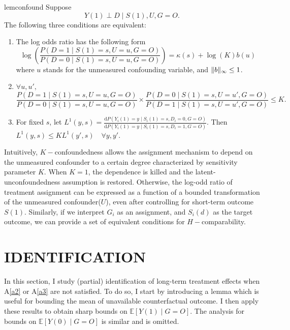 \documentclass[12pt]{article}
\newcommand{\Ep}{\mathbb{E}}
\DeclarePairedDelimiter{\norm}{\lVert}{\rVert}
\begin{document}
	\begin{restatable}{lem}{confound}
		\label{confound}
		Suppose $$Y(1) \perp D \mid S(1), U, G = O.$$
		The following three conditions are equivalent:
		\begin{enumerate}[label=(\alph*)]
			\item The log odds ratio has the following form $$\log \left(\frac{P(D=1 \mid S(1) = s, U=u, G = O)}{P(D=0 \mid S(1)=s, U=u, G = O)}\right)=\kappa(s)+\log (K) b(u)$$
			where $u$ stands for the unmeasured confounding variable, and $\norm{b}_{\infty} \leq 1$.

			\item $\forall u, u',$ $$\frac{P(D=1 \mid S(1) = s, U=u, G =O)}{P(D=0 \mid S(1)=s, U=u, G = O)} \times\frac{P(D=0 \mid S(1) = s, U=u', G =O)}{P(D=1 \mid S(1)=s, U=u', G = O)} \leq K.$$
			
			\item For fixed $s$, let $L^1(y,s) = \frac{\mathrm{d} P(Y_i(1) = y \mid S_i(1) = s, D_i = 0, G = O)}{\mathrm{d} P(Y_i(1) = y \mid S_i(1) = s, D_i = 1, G = O)}$. Then $L^1(y,s) \leq K L^1(y',s) \quad \forall y,y'$.
		\end{enumerate}
	\end{restatable}
	    
	Intuitively, $K-$confoundedness allows the assignment mechanism to depend on the unmeasured confounder to a certain degree characterized by sensitivity parameter $K$. When $K = 1$, the dependence is killed and the latent-unconfoundedness assumption is restored. Otherwise, the log-odd ratio of treatment assignment can be expressed as a function of a bounded transformation of the unmeasured confounder($U$), even after controlling for short-term outcome $S(1)$. Similarly, if we interpret $G_i$ as an assignment, and $S_i(d)$ as the target outcome, we can provide a set of equivalent conditions for $H-$comparability.
	
	\section{IDENTIFICATION}
	
	In this section, I study (partial) identification of long-term treatment effects when A\ref{a2} or A\ref{a3} are not satisfied. To do so, I start by introducing a lemma which is useful for bounding the mean of unavailable counterfactual outcome. I then apply these results to obtain sharp bounds on $\Ep[Y(1) \mid G = O]$. The analysis for bounds on $\Ep[Y(0) \mid G = O]$ is similar and is omitted.
	
\end{document}
